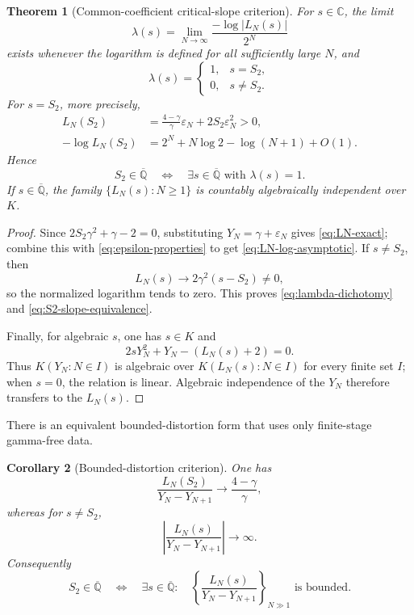 \documentclass[11pt]{article}
\newtheorem{theorem}{Theorem}[section]
\newtheorem{corollary}[theorem]{Corollary}
\theoremstyle{definition}
\theoremstyle{remark}
\newcommand{\Qbar}{\overline{\mathbb Q}}
\newcommand{\C}{\mathbb C}
\begin{document}
\begin{theorem}[Common-coefficient critical-slope criterion]
\label{thm:critical-slope}
For \(s\in\C\), the limit
\[
 \lambda(s)=\lim_{N\to\infty}
 \frac{-\log|L_N(s)|}{2^N}
\]
exists whenever the logarithm is defined for all sufficiently large \(N\),
and
\begin{equation}\label{eq:lambda-dichotomy}
 \lambda(s)=
 \begin{cases}
 1,&s=S_2,\\
 0,&s\ne S_2.
 \end{cases}
\end{equation}
For \(s=S_2\), more precisely,
\begin{align}
 L_N(S_2)
 &=\frac{4-\gamma}{\gamma}\varepsilon_N
 +2S_2\varepsilon_N^2>0,\label{eq:LN-exact}\\
 -\log L_N(S_2)
 &=2^N+N\log2-\log(N+1)+O(1).
 \label{eq:LN-log-asymptotic}
\end{align}
Hence
\begin{equation}\label{eq:S2-slope-equivalence}
 \boxed{\displaystyle
 S_2\in\Qbar
 \quad\Longleftrightarrow\quad
 \exists s\in\Qbar\text{ with }\lambda(s)=1.}
\end{equation}
If \(s\in\Qbar\), the family \(\{L_N(s):N\ge1\}\) is countably
algebraically independent over \(K\).
\end{theorem}

\begin{proof}
Since \(2S_2\gamma^2+\gamma-2=0\), substituting
\(Y_N=\gamma+\varepsilon_N\) gives \eqref{eq:LN-exact}; combine this with
\eqref{eq:epsilon-properties} to get \eqref{eq:LN-log-asymptotic}.  If
\(s\ne S_2\), then
\[
 L_N(s)\longrightarrow2\gamma^2(s-S_2)\ne0,
\]
so the normalized logarithm tends to zero.  This proves
\eqref{eq:lambda-dichotomy} and \eqref{eq:S2-slope-equivalence}.

Finally, for algebraic \(s\), one has \(s\in K\) and
\[
 2sY_N^2+Y_N-(L_N(s)+2)=0.
\]
Thus \(K(Y_N:N\in I)\) is algebraic over
\(K(L_N(s):N\in I)\) for every finite set \(I\); when \(s=0\), the relation
is linear.  Algebraic independence of the \(Y_N\) therefore transfers to the
\(L_N(s)\).
\end{proof}

There is an equivalent bounded-distortion form that uses only finite-stage
gamma-free data.

\begin{corollary}[Bounded-distortion criterion]
\label{cor:bounded-distortion}
One has
\begin{equation}\label{eq:bounded-distortion-limit}
 \frac{L_N(S_2)}{Y_N-Y_{N+1}}
 \longrightarrow\frac{4-\gamma}{\gamma},
\end{equation}
whereas for \(s\ne S_2\),
\[
 \left|\frac{L_N(s)}{Y_N-Y_{N+1}}\right|\longrightarrow\infty.
\]
Consequently
\begin{equation}\label{eq:bounded-equivalence}
 S_2\in\Qbar
 \quad\Longleftrightarrow\quad
 \exists s\in\Qbar:\quad
 \left\{\frac{L_N(s)}{Y_N-Y_{N+1}}\right\}_{N\gg1}
 \text{ is bounded}.
\end{equation}
\end{corollary}
\end{document}
